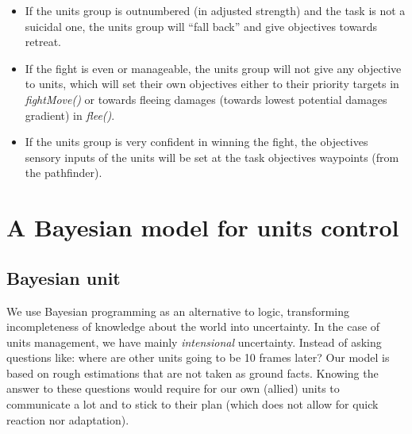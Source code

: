 \begin{itemize}
\begin{itemize}
    \item If the units group is outnumbered (in adjusted strength) and the task is not a suicidal one, the units group will ``fall back'' and give objectives towards retreat. 
    \item If the fight is even or manageable, the units group will not give any objective to units, which will set their own objectives either to their priority targets in \textit{fightMove()} or towards fleeing damages (towards lowest potential damages gradient) in \textit{flee()}.
    \item If the units group is very confident in winning the fight, the objectives sensory inputs of the units will be set at the task objectives waypoints (from the pathfinder).
\end{itemize}
\end{itemize} 

\section{A Bayesian model for units control}

\label{sec:bayesianunit}
\subsection{Bayesian unit}

We use Bayesian programming as an alternative to logic, transforming incompleteness of knowledge about the world into uncertainty. In the case of units management, we have mainly \textit{intensional} uncertainty. Instead of asking questions like: where are other units going to be 10 frames later? Our model is based on rough estimations that are not taken as ground facts. Knowing the answer to these questions would require for our own (allied) units to communicate a lot and to stick to their plan (which does not allow for quick reaction nor adaptation). 

